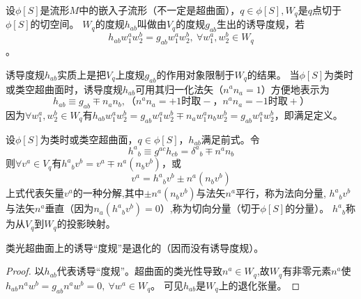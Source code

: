 \begin{definition}
	设$\phi[S]$是流形$M$中的嵌入子流形（不一定是超曲面），$q \in \phi[S], W_q$是$q$点切于$\phi[S]$的切空间。
	$W_q$的度规$h_{ab}$叫做由$V_q$的度规$g_{ab}$生出的诱导度规，若
	$$h_{ab}w_1^aw_2^b = g_{ab}w_1^aw_2^b, ~ \forall w_1^a, w_2^b \in W_q$$。
\end{definition}

诱导度规$h_{ab}$实质上是把$V_q$上度规$g_{ab}$的作用对象限制于$W_q$的结果。
当$\phi[S]$为类时或类空超曲面时，诱导度规$h_{ab}$可用其归一化法矢（$n^an_a = 1$）方便地表示为
$$h_{ab} \equiv g_{ab} \mp n_an_b, \text{（$n^an_a = +1$时取$-$，$n^an_a = -1$时取$+$）}$$
因为$\forall w_1^a, w_2^b \in W_q$有$h_{ab}w_1^aw_2^b = g_{ab}w_1^aw_2^b \mp n_aw_1^an_bw_2^b = g_{ab}w_1^aw_2^b$，即满足定义。

设$\phi[S]$为类时或类空超曲面，$q \in \phi[S]$，$h_{ab}$满足前式。令
$$h^a{}_b \equiv g^{ac}h_{cb} = \delta^a{}_b \mp n^an_b$$
则$\forall v^a \in V_q$有$h^a{}_bv^b = v^a \mp n^a(n_bv^b)$，或
$$v^a = h^a{}_bv^b \pm n^a(n_bv^b)$$
上式代表矢量$v^a$的一种分解,其中$\pm n^a(n_bv^b)$与法矢$n^a$平行，称为法向分量,
$h^a{}_bv^b$与法矢$n^a$垂直（因为$n_a(h^a{}_bv^b) = 0$）,称为切向分量（切于$\phi[S]$的分量）。
$h^a{}_b$称为从$V_q$到$W_q$的投影映射。

\begin{theorem}
	类光超曲面上的诱导``度规''是退化的（因而没有诱导度规）。
\end{theorem}

\begin{proof}
	以$h_{ab}$代表诱导``度规''。超曲面的类光性导致$n^a \in W_q$,故$W_q$有非零元素$n^a$使$h_{ab}n^aw^b = g_{ab}n^aw^b = 0, ~ \forall w^a \in W_q$。
	可见$h_{ab}$是$W_q$上的退化张量。
\end{proof}

